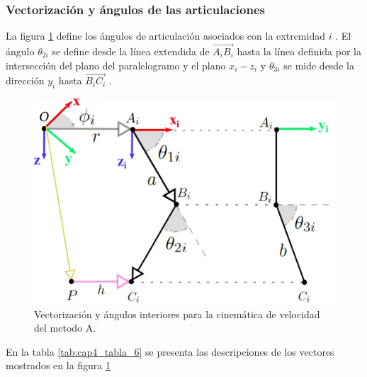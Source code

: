     \newpage

        \subsubsection{Vectorización y ángulos de las articulaciones} \label{cap4_angulosinteriores}
        
        La figura \ref{f:Cap4_Metodo_A_Modelacion_Cinematica_Posicion_8} define los ángulos de articulación asociados con la extremidad  \( i \) . El ángulo \(  \theta _{2i} \)  se define desde la línea extendida de  \( \overrightarrow{A_{i}B_{i}} \)  hasta la línea definida por la intersección del plano del paralelogramo y el plano  \( x_{i}-z_{i} \)  y  \(  \theta _{3i} \)  se mide desde la dirección  \( y_{i} \)  hasta  \( \overrightarrow{B_{i}C_{i}} \) .
        
        \begin{figure}[htb]
             \centering
             \includegraphics[width=0.97\linewidth]{Main/Chapter4/Images4/DIBUJO21.jpg}
              \caption{Vectorización y ángulos interiores para la cinemática de velocidad del metodo 
              A.}
              \label{f:Cap4_Metodo_A_Modelacion_Cinematica_Posicion_8}
        \end{figure}
        
        
        En la tabla \ref{tab:cap4_tabla_6} se presenta las descripciones de los vectores mostrados en la figura  \ref{f:Cap4_Metodo_A_Modelacion_Cinematica_Posicion_8}
        
